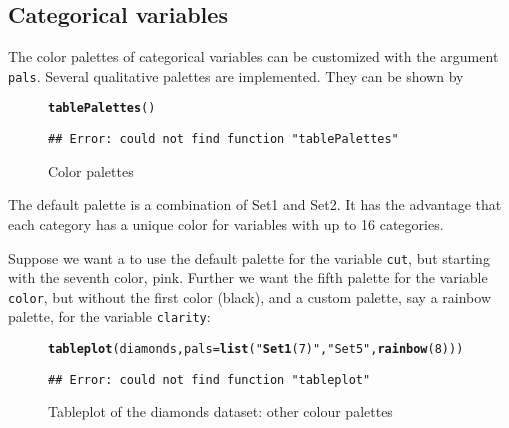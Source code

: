 \documentclass[11pt, fleqn, a4paper]{article}\usepackage{graphicx, color}
\makeatletter
\newcommand{\hlfunctioncall}[1]{\textcolor[rgb]{0.501960784313725,0,0.329411764705882}{\textbf{#1}}}%
\newcommand{\hlstring}[1]{\textcolor[rgb]{0.6,0.6,1}{#1}}%
\newenvironment{kframe}{%
 \def\FrameCommand##1{\hskip\@totalleftmargin \hskip-\fboxsep
 \colorbox{shadecolor}{##1}\hskip-\fboxsep
     \hskip-\linewidth \hskip-\@totalleftmargin \hskip\columnwidth}%
 \MakeFramed {\advance\hsize-\width
   \@totalleftmargin\z@ \linewidth\hsize
   \@setminipage}}%
 {\par\unskip\endMakeFramed}
\newenvironment{knitrout}{}{} %
\makeatother
\begin{document}
\subsection{Categorical variables}
The color palettes of categorical variables can be customized with the argument {\tt pals}. Several qualitative palettes are implemented. They can be shown by

\begin{figure}[htp]
\begin{knitrout}
\color{fgcolor}\begin{kframe}
\begin{alltt}
\hlfunctioncall{tablePalettes}()
\end{alltt}
\begin{verbatim}
## Error: could not find function "tablePalettes"
\end{verbatim}
\end{kframe}
\end{knitrout}

\caption{Color palettes}
\label{fig:pals}
\end{figure}

The default palette is a combination of Set1 and Set2. It has the advantage that each category has a unique color for variables with up to 16 categories.

Suppose we want a to use the default palette for the variable {\tt cut}, but starting with the seventh color, pink. Further we want the fifth palette for the variable {\tt color}, but without the first color (black), and a custom palette, say a rainbow palette, for the variable {\tt clarity}:


\begin{figure}[htp]
\begin{knitrout}
\color{fgcolor}\begin{kframe}
\begin{alltt}
\hlfunctioncall{tableplot}(diamonds, pals = \hlfunctioncall{list}(\hlstring{"\hlfunctioncall{Set1}(7)"}, \hlstring{"Set5"}, \hlfunctioncall{rainbow}(8)))
\end{alltt}
\begin{verbatim}
## Error: could not find function "tableplot"
\end{verbatim}
\end{kframe}
\end{knitrout}

\caption{Tableplot of the diamonds dataset: other colour palettes}
\label{fig:tp4}
\end{figure}
\end{document}

